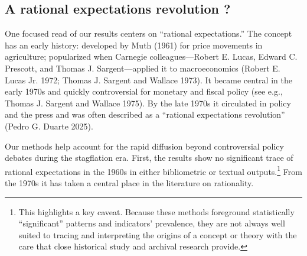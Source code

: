 \documentclass[
]{interact}
\begin{document}
\subsection{A rational expectations revolution
?}\label{a-rational-expectations-revolution}

One focused read of our results centers on ``rational expectations.''
The concept has an early history: developed by Muth (1961) for price
movements in agriculture; popularized when Carnegie colleagues---Robert
E. Lucas, Edward C. Prescott, and Thomas J. Sargent---applied it to
macroeconomics (Robert E. Lucas Jr. 1972; Thomas J. Sargent and Wallace
1973). It became central in the early 1970s and quickly controversial
for monetary and fiscal policy (see e.g., Thomas J. Sargent and Wallace
1975). By the late 1970s it circulated in policy and the press and was
often described as a ``rational expectations revolution'' (Pedro G.
Duarte 2025).

Our methods help account for the rapid diffusion beyond controversial
policy debates during the stagflation era. First, the results show no
significant trace of rational expectations in the 1960s in either
bibliometric or textual outputs.\footnote{This highlights a key caveat.
  Because these methods foreground statistically ``significant''
  patterns and indicators' prevalence, they are not always well suited
  to tracing and interpreting the origins of a concept or theory with
  the care that close historical study and archival research provide.}
From the 1970s it has taken a central place in the literature on
rationality.
\end{document}
